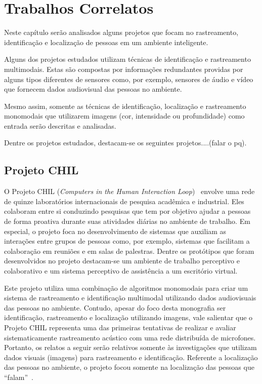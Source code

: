 \chapter{Trabalhos Correlatos}

Neste capítulo serão analisados alguns projetos que focam no rastreamento, identificação e localização de pessoas em um ambiente inteligente. 

Alguns dos projetos estudados utilizam técnicas de identificação e rastreamento multimodais. Estas são compostas por informações redundantes providas por alguns tipos diferentes de sensores como, por exemplo, sensores de áudio e vídeo que fornecem dados audiovisual  das pessoas no ambiente.

Mesmo assim, somente as técnicas de identificação, localização e rastreamento monomodais que utilizarem imagens (cor, intensidade ou profundidade) como entrada serão descritas e analisadas.

Dentre os projetos estudados, destacam-se os seguintes projetos....(falar o pq).

\section{Projeto CHIL}

O Projeto CHIL (\textit{Computers in the Human Interaction Loop})~\cite{chil, computerschil} envolve uma rede de quinze laboratórios internacionais de pesquisa acadêmica e industrial. Eles colaboram entre si conduzindo pesquisas que tem por objetivo ajudar a pessoas de forma proativa durante suas atividades diárias no ambiente de trabalho. Em especial, o projeto foca no desenvolvimento de sistemas que auxiliam as interações entre grupos de pessoas como, por exemplo, sistemas que facilitam a colaboração em reuniões e em salas de palestras. Dentre os protótipos que foram desenvolvidos no projeto destacam-se um ambiente de trabalho perceptivo e colaborativo e um sistema perceptivo de assistência a um escritório virtual.

Este projeto utiliza uma combinação de algoritmos monomodais para criar um sistema de rastreamento e identificação multimodal utilizando dados audiovisuais das pessoas no ambiente. Contudo, apesar do foco desta monografia ser identificação, rastreamento e localização utilizando imagens, vale salientar que o Projeto CHIL representa uma das primeiras tentativas de realizar e avaliar sistematicamente rastreamento acústico com uma rede distribuída de microfones. Portanto, os relatos a seguir serão relativos somente às investigações que utilizam dados visuais (imagens) para rastreamento e identificação. Referente a localização das pessoas no ambiente, o projeto focou somente na localização das pessoas que ``falam''~\cite{speaker-localization}.

